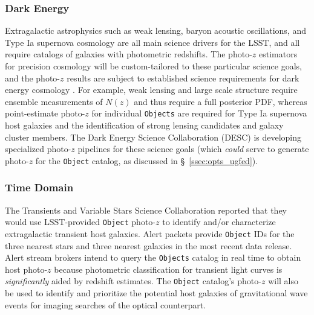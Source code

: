\documentclass[DM,lsstdraft,toc]{lsstdoc}
\begin{document}
\subsubsection{Dark Energy}\label{sssec:use_sci_de}
Extragalactic astrophysics such as weak lensing, baryon acoustic oscillations, and Type Ia supernova cosmology are all main science drivers for the LSST, and all require catalogs of galaxies with photometric redshifts.
The photo-$z$ estimators for precision cosmology will be custom-tailored to these particular science goals, and the photo-$z$ results are subject to established science requirements for dark energy cosmology \citep{2018arXiv180901669T}.
For example, weak lensing and large scale structure require ensemble measurements of $N(z)$ and thus require a full posterior PDF, whereas point-estimate photo-$z$ for individual {\tt Objects} are required for Type Ia supernova host galaxies and the identification of strong lensing candidates and galaxy cluster members. 
The Dark Energy Science Collaboration (DESC) is developing specialized photo-$z$ pipelines for these science goals (which {\it could} serve to generate photo-$z$ for the {\tt Object} catalog, as discussed in \S~\ref{ssec:opts_ugfed}).

\subsubsection{Time Domain}\label{sssec:use_sci_td}
The Transients and Variable Stars Science Collaboration reported that they would use LSST-provided {\tt Object} photo-$z$ to identify and/or characterize extragalactic transient host galaxies.
Alert packets provide {\tt Object} IDs for the three nearest stars and three nearest galaxies in the most recent data release.
Alert stream brokers intend to query the {\tt Objects} catalog in real time to obtain host photo-$z$ because photometric classification for transient light curves is {\it significantly} aided by redshift estimates.
The {\tt Object} catalog's photo-$z$ will also be used to identify and prioritize the potential host galaxies of gravitational wave events for imaging searches of the optical counterpart.
\end{document}
